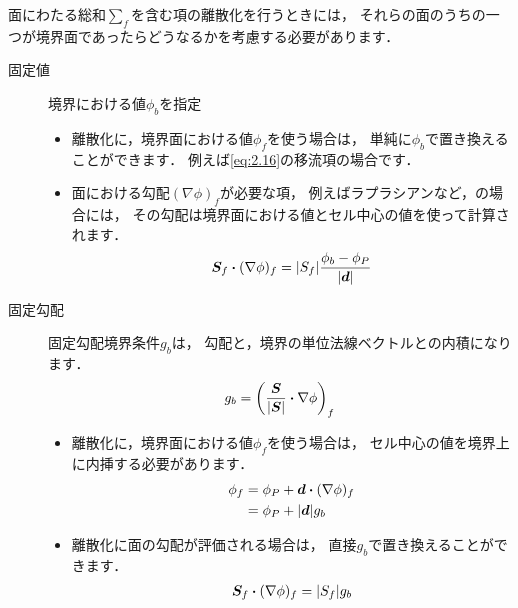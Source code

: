 面にわたる総和$\sum_{f}$を含む項の離散化を行うときには，
それらの面のうちの一つが境界面であったらどうなるかを考慮する必要があります．
\begin{description}
 \item[固定値] 境界における値$\phi_{b}$を指定
            \begin{itemize}
             \item 離散化に，境界面における値$\phi_{f}$を使う場合は，
                   単純に$\phi_{b}$で置き換えることができます．
                   例えば\autoref{eq:2.16}の移流項の場合です．
             \item 面における勾配$(\nabla\phi)_{f}$が必要な項，
                   例えばラプラシアンなど，の場合には，
                   その勾配は境界面における値とセル中心の値を使って計算されます．
                   \begin{align}
                    \label{eq:2.38}
                    \bm{S}_{f} \inProd (\nabla\phi)_{f}
                    = |S_{f}|\frac{\phi_{b} - \phi_{P}}{|\bm{d}|}
                   \end{align}
            \end{itemize}
 \item[固定勾配] 固定勾配境界条件$g_{b}$は，
            勾配と，境界の単位法線ベクトルとの内積になります．
            \begin{align}
             \label{eq:2.39}
             g_{b} = \left(\frac{\bm{S}}{|\bm{S}|} \inProd \nabla\phi\right)_{f}
            \end{align}
            \begin{itemize}
             \item 離散化に，境界面における値$\phi_{f}$を使う場合は，
                   セル中心の値を境界上に内挿する必要があります．
                   \begin{align}
                    \label{eq:2.40}
                    \phi_{f}
                    &= \phi_{P} + \bm{d} \inProd (\nabla\phi)_{f} \notag \\
                    &= \phi_{P} + |\bm{d}|g_{b}
                   \end{align}
             \item 離散化に面の勾配が評価される場合は，
                   直接$g_{b}$で置き換えることができます．
                   \begin{align}
                    \label{eq:2.41}
                    \bm{S}_{f} \inProd (\nabla\phi)_{f} = |S_{f}|g_{b}
                   \end{align}
            \end{itemize}
\end{description}


